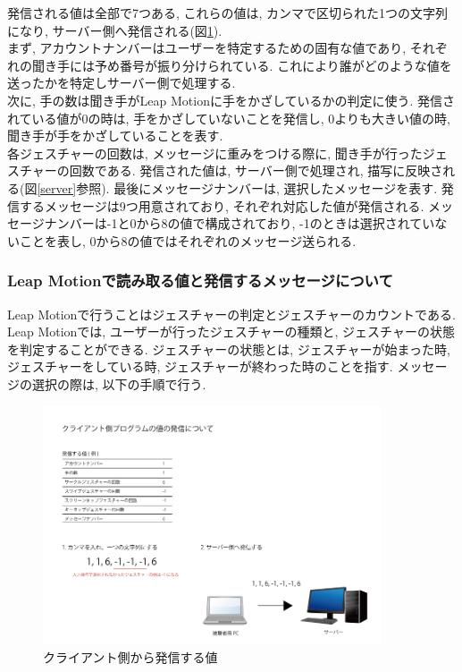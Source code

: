 \documentclass{funthesis}
\begin{document}
発信される値は全部で7つある, これらの値は, カンマで区切られた1つの文字列になり, サーバー側へ発信される(図\ref{send}).\\ 
まず, アカウントナンバーはユーザーを特定するための固有な値であり, それぞれの聞き手には予め番号が振り分けられている. これにより誰がどのような値を送ったかを特定しサーバー側で処理する. \\
次に, 手の数は聞き手がLeap Motionに手をかざしているかの判定に使う. 発信されている値が0の時は, 手をかざしていないことを発信し, 0よりも大きい値の時, 聞き手が手をかざしていることを表す. \\
各ジェスチャーの回数は, メッセージに重みをつける際に, 聞き手が行ったジェスチャーの回数である. 発信された値は, サーバー側で処理され, 描写に反映される(図\ref{server}参照). 
最後にメッセージナンバーは, 選択したメッセージを表す. 発信するメッセージは9つ用意されており, それぞれ対応した値が発信される. メッセージナンバーは-1と0から8の値で構成されており, -1のときは選択されていないことを表し, 0から8の値ではそれぞれのメッセージ送られる. \\

\subsubsection{Leap Motionで読み取る値と発信するメッセージについて}
Leap Motionで行うことはジェスチャーの判定とジェスチャーのカウントである.  Leap Motionでは, ユーザーが行ったジェスチャーの種類と, ジェスチャーの状態を判定することができる. ジェスチャーの状態とは, ジェスチャーが始まった時, ジェスチャーをしている時, ジェスチャーが終わった時のことを指す. メッセージの選択の際は, 以下の手順で行う. 





\begin{figure}[H]
 \begin{center}
  \includegraphics[width=100mm]{./img/sendCL.png}
 \end{center}
 \caption{クライアント側から発信する値}
 \label{send}
\end{figure}
\end{document}
